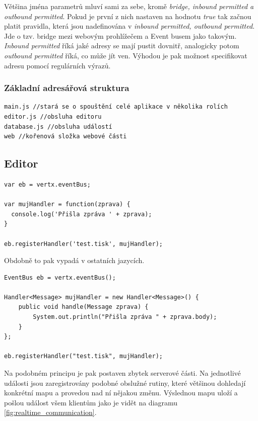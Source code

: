 Většina jména parametrů mluví sami za sebe, kromě \emph{bridge, inbound permitted a outbound permitted}. Pokud je první z nich nastaven na hodnotu \emph{true} tak začnou platit pravidla, která jsou nadefinována v \emph{inbound permitted, outbound permitted}. Jde o tzv. bridge mezi webovým prohlížečem a Event busem jako takovým. \emph{Inbound permitted} říká jaké adresy se mají pustit dovnitř, analogicky potom \emph{outbound permitted} říká, co může jít ven. Výhodou je pak možnost specifikovat adresu pomocí regulárních výrazů.

\subsubsection{Základní adresářová struktura}

\begin{lstlisting}
main.js //stará se o spouštění celé aplikace v několika rolích
editor.js //obsluha editoru
database.js //obsluha událostí 
web //kořenová složka webové části
\end{lstlisting}

\subsection{Editor}

\begin{lstlisting}[caption=Zaregistrování obslužné rutiny v jazyce JavaScript]
var eb = vertx.eventBus;

var mujHandler = function(zprava) {
  console.log('Přišla zpráva ' + zprava);
}

eb.registerHandler('test.tisk', mujHandler);
\end{lstlisting}

Obdobně to pak vypadá v ostatních jazycích. 

\begin{lstlisting}[caption=Zaregistrování obslužné rutiny v jazyce Java]
EventBus eb = vertx.eventBus();

Handler<Message> mujHandler = new Handler<Message>() {
    public void handle(Message zprava) {
        System.out.println("Přišla zpráva " + zprava.body);
    }
};

eb.registerHandler("test.tisk", mujHandler);
\end{lstlisting}

Na podobném principu je pak postaven zbytek serverové části. Na jednotlivé události jsou zaregistrovány podobné obslužné rutiny, které většinou dohledají konkrétní mapu a provedou nad ní nějakou změnu. Výslednou mapu uloží a pošlou událost všem klientům jako je vidět na diagramu \ref{fig:realtime_communication}.

